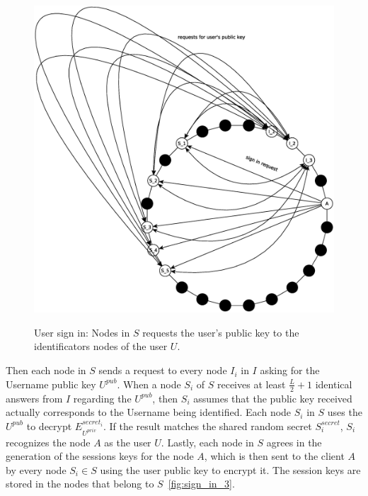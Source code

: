 \begin{figure}[!htb]
\centering
\includegraphics[width=14cm]{../img/sign_in_2}\\
\caption{User sign in: Nodes in $S$ requests the user's public key to the
identificators nodes of the user $U$.}
\label{fig:sign_in_2}
\end{figure}

Then each node in $S$ sends a request to every node $I_i$ in $I$ asking for the Username public key $U^{pub}$. When a node
$S_i$ of $S$ receives at least $\frac{L}{2} + 1$ identical answers from
$I$ regarding the $U^{pub}$, then $S_i$ assumes that the public key received
actually corresponds to the Username being identified. Each node $S_i$ in $S$
uses the $U^{pub}$ to decrypt $E^{secret_i}_{U^{priv}}$. If the result matches
the shared random secret $S^{secret}_i$, $S_i$ recognizes the node $A$ as the
user $U$.
Lastly, each node in $S$ agrees in the generation of the sessions keys for the
node $A$, which is then sent to the client $A$ by every node $S_i \in S$ using
the user public key to encrypt it. The session keys are stored in the
nodes that belong to $S$~\ref{fig:sign_in_3}.

